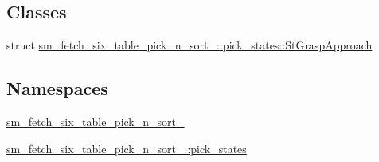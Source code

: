 \subsection*{Classes}
\begin{DoxyCompactItemize}
\item 
struct \hyperlink{structsm__fetch__six__table__pick__n__sort__1_1_1pick__states_1_1StGraspApproach}{sm\+\_\+fetch\+\_\+six\+\_\+table\+\_\+pick\+\_\+n\+\_\+sort\+\_\+::pick\+\_\+states\+::\+St\+Grasp\+Approach}
\end{DoxyCompactItemize}
\subsection*{Namespaces}
\begin{DoxyCompactItemize}
\item 
 \hyperlink{namespacesm__fetch__six__table__pick__n__sort__1}{sm\+\_\+fetch\+\_\+six\+\_\+table\+\_\+pick\+\_\+n\+\_\+sort\+\_}
\item 
 \hyperlink{namespacesm__fetch__six__table__pick__n__sort__1_1_1pick__states}{sm\+\_\+fetch\+\_\+six\+\_\+table\+\_\+pick\+\_\+n\+\_\+sort\+\_\+::pick\+\_\+states}
\end{DoxyCompactItemize}
